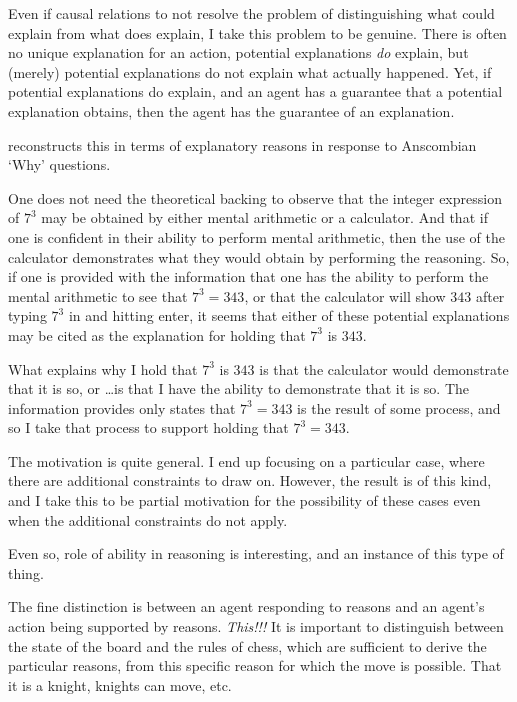 \documentclass[10pt]{article}
\begin{document}
Even if causal relations to not resolve the problem of distinguishing what could explain from what does explain, I take this problem to be genuine.
There is often no unique explanation for an action, potential explanations \emph{do} explain, but (merely) potential explanations do not explain what actually happened.
Yet, if potential explanations do explain, and an agent has a guarantee that a potential explanation obtains, then the agent has the guarantee of an explanation.

\begin{note}
  \citeauthor{Neta:2019aa} reconstructs this in terms of explanatory reasons in response to Anscombian `Why' questions.
\end{note}

One does not need the theoretical backing to observe that the integer expression of \(7^{3}\) may be obtained by either mental arithmetic or a calculator.
And that if one is confident in their ability to perform mental arithmetic, then the use of the calculator demonstrates what they would obtain by performing the reasoning.
So, if one is provided with the information that one has the ability to perform the mental arithmetic to see that \(7^{3} = 343\), or that the calculator will show \(343\) after typing \(7^{3}\) in and hitting enter, it seems that either of these potential explanations may be cited as the explanation for holding that \(7^{3}\) is \(343\).

What explains why I hold that \(7^{3}\) is \(343\) is that the calculator would demonstrate that it is so, or \dots is that I have the ability to demonstrate that it is so.
The information provides only states that \(7^{3} = 343\) is the result of some process, and so I take that process to support holding that \(7^{3} = 343\).

{
  \color{red}
  The \citeauthor{Davidson:1963aa} motivation is quite general.
  I end up focusing on a particular case, where there are additional constraints to draw on.
  However, the result is of this kind, and I take this to be partial motivation for the possibility of these cases even when the additional constraints do not apply.

  Even so, role of ability in reasoning is interesting, and an instance of this type of thing.
}


\begin{note}
  The fine distinction is between an agent responding to reasons and an agent's action being supported by reasons.
  {
    \color{red}
    \emph{This!!!}
  }
  It is important to distinguish between the state of the board and the rules of chess, which are sufficient to derive the particular reasons, from this specific reason for which the move is possible.
  That it is a knight, knights can move, etc.
\end{note}
\end{document}
